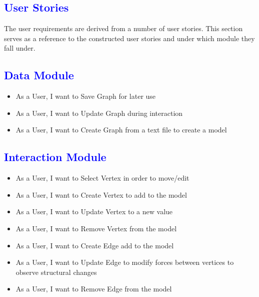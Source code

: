 \documentclass[12pt]{article}
\begin{document}
\textcolor{blue}{\section{User Stories}}
\begin{flushleft}
	The user requirements are derived from a number of user stories. This section serves as a reference to the constructed user stories and under which module they fall under.	
	
	\textcolor{blue}{\subsection{Data Module}}	
	\begin{flushleft}
	\begin{itemize}
	\item As a User, I want to Save Graph for later use
	\item As a User, I want to Update Graph during interaction
	\item As a User, I want to Create Graph from a text file to create a model
	\end{itemize}	
	\end{flushleft}
	
	\textcolor{blue}{\subsection{Interaction Module}}	
	\begin{flushleft}
	\begin{itemize}
	\item As a User, I want to Select Vertex in order to move/edit
	\item As a User, I want to Create Vertex to add to the model
	\item As a User, I want to Update Vertex to a new value
	\item As a User, I want to Remove Vertex from the model
	\item As a User, I want to Create Edge add to the model
	\item As a User, I want to Update Edge to modify forces between vertices to observe structural changes
	\item As a User, I want to Remove Edge from the model
	\end{itemize}	
	\end{flushleft}
	

\end{flushleft}
\end{document}
